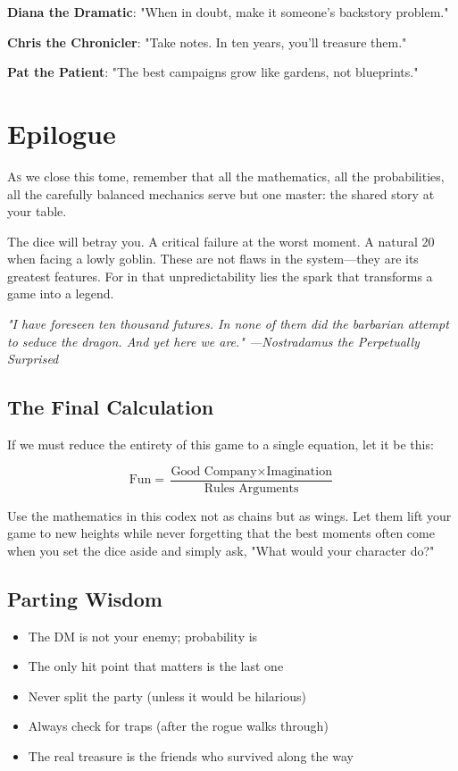 \documentclass[11pt,letterpaper,openany]{book}
\newcommand{\fantasyquote}[1]{%
\begin{center}
\textit{\large #1}
\end{center}
}
\begin{document}
\textbf{Diana the Dramatic}: "When in doubt, make it someone's backstory problem."

\textbf{Chris the Chronicler}: "Take notes. In ten years, you'll treasure them."

\textbf{Pat the Patient}: "The best campaigns grow like gardens, not blueprints."

\chapter*{Epilogue}

\lettrine[lines=3]{A}{s} we close this tome, remember that all the mathematics, all the probabilities, all the carefully balanced mechanics serve but one master: the shared story at your table.

The dice will betray you. A critical failure at the worst moment. A natural 20 when facing a lowly goblin. These are not flaws in the system—they are its greatest features. For in that unpredictability lies the spark that transforms a game into a legend.

\fantasyquote{"I have foreseen ten thousand futures. In none of them did the barbarian attempt to seduce the dragon. And yet here we are." —Nostradamus the Perpetually Surprised}

\section*{The Final Calculation}

If we must reduce the entirety of this game to a single equation, let it be this:

\begin{equation}
\text{Fun} = \frac{\text{Good Company} \times \text{Imagination}}{\text{Rules Arguments}}
\end{equation}

Use the mathematics in this codex not as chains but as wings. Let them lift your game to new heights while never forgetting that the best moments often come when you set the dice aside and simply ask, "What would your character do?"

\section*{Parting Wisdom}

\begin{itemize}
    \item The DM is not your enemy; probability is
    \item The only hit point that matters is the last one
    \item Never split the party (unless it would be hilarious)
    \item Always check for traps (after the rogue walks through)
    \item The real treasure is the friends who survived along the way
\end{itemize}
\end{document}

